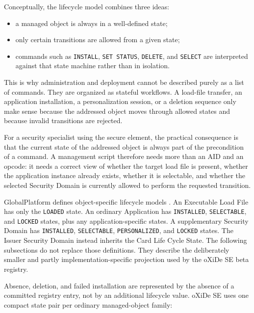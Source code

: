 Conceptually, the lifecycle model combines three ideas:

\begin{itemize}
\item a managed object is always in a well-defined state;
\item only certain transitions are allowed from a given state;
\item commands such as \texttt{INSTALL}, \texttt{SET STATUS},
  \texttt{DELETE}, and \texttt{SELECT} are interpreted against that
  state machine rather than in isolation.
\end{itemize}

This is why administration and deployment cannot be described purely as a
list of commands. They are organized as stateful workflows. A load-file
transfer, an application installation, a personalization session, or a
deletion sequence only make sense because the addressed object moves
through allowed states and because invalid transitions are rejected.

For a security specialist using the secure element, the practical consequence is
that the current state of the addressed object is always part of the
precondition of a command. A management script therefore needs more than
an AID and an opcode: it needs a correct view of whether the target load
file is present, whether the application instance already exists, whether
it is selectable, and whether the selected Security Domain is currently
allowed to perform the requested transition.

GlobalPlatform defines object-specific lifecycle models
. An Executable Load File has only the
\texttt{LOADED} state. An ordinary Application has \texttt{INSTALLED},
\texttt{SELECTABLE}, and \texttt{LOCKED} states, plus any application-specific
states. A supplementary Security Domain has \texttt{INSTALLED},
\texttt{SELECTABLE}, \texttt{PERSONALIZED}, and \texttt{LOCKED} states. The
Issuer Security Domain instead inherits the Card Life Cycle State. The
following subsections do not replace those definitions. They describe the
deliberately smaller and partly implementation-specific projection used by the
oXiDe SE beta registry.

Absence, deletion, and failed installation are represented by the absence of a
committed registry entry, not by an additional lifecycle value. oXiDe SE uses
one compact state pair per ordinary managed-object family:


